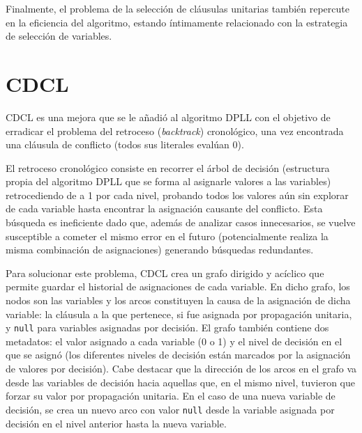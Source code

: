 Finalmente, el problema de la selección de cláusulas unitarias también repercute en la eficiencia del algoritmo, estando íntimamente relacionado con la estrategia de selección de variables.

\section{CDCL}
CDCL es una mejora que se le a\~nadi\'o al algoritmo DPLL con el objetivo de erradicar el problema del retroceso (\textit{backtrack}) cronol\'ogico, una vez encontrada una cl\'ausula de conflicto (todos sus literales eval\'uan 0).

El retroceso cronol\'ogico consiste en recorrer el \'arbol de decisi\'on (estructura propia del algoritmo DPLL que se forma al asignarle valores a las variables) retrocediendo de a 1 por cada nivel, probando todos los valores a\'un sin explorar de cada variable hasta encontrar la asignaci\'on causante del conflicto. Esta b\'usqueda es ineficiente dado que, adem\'as de analizar casos innecesarios, se vuelve susceptible a cometer el mismo error en el futuro (potencialmente realiza la misma combinaci\'on de asignaciones) generando b\'usquedas redundantes.

Para solucionar este problema, CDCL crea un grafo dirigido y ac\'iclico que permite guardar el historial de asignaciones de cada variable. En dicho grafo, los nodos son las variables y los arcos constituyen la causa de la asignaci\'on de dicha variable: la cl\'ausula a la que pertenece, si fue asignada por propagaci\'on unitaria, y \texttt{null} para variables asignadas por decisi\'on. El grafo tambi\'en contiene dos metadatos: el valor asignado a cada variable (0 o 1) y el nivel de decisi\'on en el que se asign\'o (los diferentes niveles de decisi\'on est\'an marcados por la asignaci\'on de valores por decisi\'on). Cabe destacar que la direcci\'on de los arcos en el grafo va desde las variables de decisi\'on hacia aquellas que, en el mismo nivel, tuvieron que forzar su valor por propagaci\'on unitaria. En el caso de una nueva variable de decisi\'on, se crea un nuevo arco con valor \texttt{null} desde la variable asignada por decisi\'on en el nivel anterior hasta la nueva variable.

